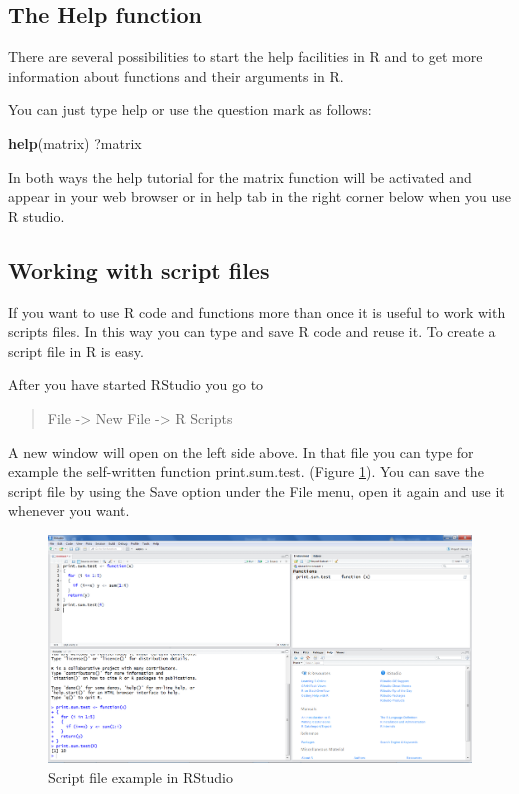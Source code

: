 \documentclass[]{book}
\newenvironment{Shaded}{\begin{snugshade}}{\end{snugshade}}
\newcommand{\KeywordTok}[1]{\textcolor[rgb]{0.13,0.29,0.53}{\textbf{#1}}}
\newcommand{\NormalTok}[1]{#1}
\begin{document}
\subsection{The Help function}\label{the-help-function}

There are several possibilities to start the help facilities in R and to
get more information about functions and their arguments in R.

You can just type help or use the question mark as follows:

\begin{Shaded}
\begin{Highlighting}[]
\KeywordTok{help}\NormalTok{(matrix)}
\NormalTok{?matrix}
\end{Highlighting}
\end{Shaded}

In both ways the help tutorial for the matrix function will be activated
and appear in your web browser or in help tab in the right corner below
when you use R studio.

\subsection{Working with script files}\label{working-with-script-files}

If you want to use R code and functions more than once it is useful to
work with scripts files. In this way you can type and save R code and
reuse it. To create a script file in R is easy.

After you have started RStudio you go to

\begin{quote}
File -\textgreater{} New File -\textgreater{} R Scripts
\end{quote}

A new window will open on the left side above. In that file you can type
for example the self-written function print.sum.test. (Figure
\ref{fig:fig11}). You can save the script file by using the Save option
under the File menu, open it again and use it whenever you want.

\begin{figure}

{\centering \includegraphics[width=0.95\linewidth]{images/fig1.11} 

}

\caption{Script file example in RStudio}\label{fig:fig11}
\end{figure}
\end{document}
